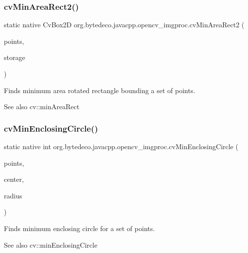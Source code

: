 \subsubsection{\texorpdfstring{cv\+Min\+Area\+Rect2()}{cvMinAreaRect2()}}
{\footnotesize\ttfamily static native Cv\+Box2D org.\+bytedeco.\+javacpp.\+opencv\+\_\+imgproc.\+cv\+Min\+Area\+Rect2 (\begin{DoxyParamCaption}\item[{@Const Cv\+Arr}]{points,  }\item[{Cv\+Mem\+Storage}]{storage }\end{DoxyParamCaption})\hspace{0.3cm}{\ttfamily [static]}}



Finds minimum area rotated rectangle bounding a set of points. 

\begin{DoxySeeAlso}{See also}
cv\+::min\+Area\+Rect 
\end{DoxySeeAlso}
\mbox{\label{group__imgproc__c_ga20312fae33ba176dda93b108421e4fc7}} 
\subsubsection{\texorpdfstring{cv\+Min\+Enclosing\+Circle()}{cvMinEnclosingCircle()}}
{\footnotesize\ttfamily static native int org.\+bytedeco.\+javacpp.\+opencv\+\_\+imgproc.\+cv\+Min\+Enclosing\+Circle (\begin{DoxyParamCaption}\item[{@Const Cv\+Arr}]{points,  }\item[{Cv\+Point2\+D32f}]{center,  }\item[{Float\+Pointer}]{radius }\end{DoxyParamCaption})\hspace{0.3cm}{\ttfamily [static]}}



Finds minimum enclosing circle for a set of points. 

\begin{DoxySeeAlso}{See also}
cv\+::min\+Enclosing\+Circle 
\end{DoxySeeAlso}
\mbox{\label{group__imgproc__c_gaebcdbe34c2a6e8811e34cb4fa10fcaaf}} 
